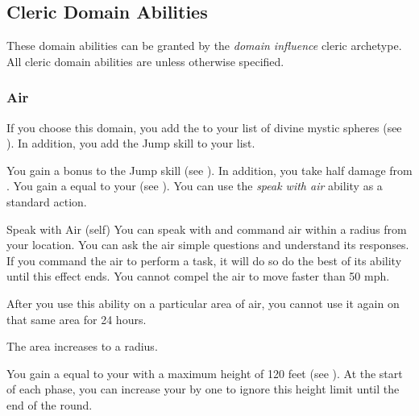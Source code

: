     \newpage
    \subsection{Cleric Domain Abilities}\label{Cleric Domain Abilities}
        These domain abilities can be granted by the \textit{domain influence} cleric archetype.
        All cleric domain abilities are  unless otherwise specified.

        \subsubsection{Air}
            If you choose this domain, you add the   to your list of divine mystic spheres (see ).
            In addition, you add the Jump skill to your  list.

             You gain a  bonus to the Jump skill (see ).
            In addition, you take half damage from .
             You gain a  equal to your  (see ).
             You can use the \textit{speak with air} ability as a standard action.
            \begin{attuneability}{Speak with Air}
                 (self)
                \rankline
                You can speak with and command air within a \areahuge radius  from your location.
                You can ask the air simple questions and understand its responses.
                If you command the air to perform a task, it will do so do the best of its ability until this effect ends.
                You cannot compel the air to move faster than 50 mph.

                After you use this ability on a particular area of air, you cannot use it again on that same area for 24 hours.

                \rankline
                 The area increases to a \areagarg radius.
            \end{attuneability}
             You gain a  equal to your  with a maximum height of 120 feet (see ).
            At the start of each phase, you can increase your  by one to ignore this height limit until the end of the round.

